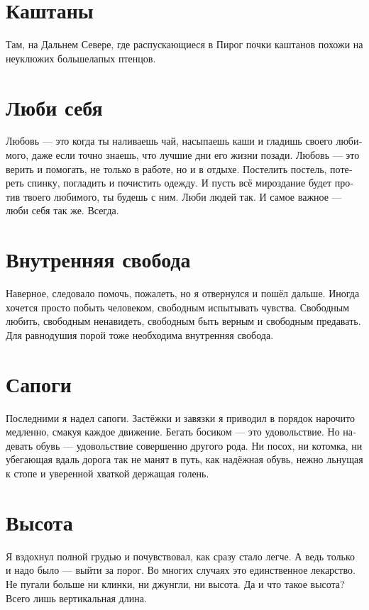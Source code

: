 \documentclass[a4paper,12pt,fleqn]{book}\usepackage{cooltooltips}\usepackage{polyglossia}\setdefaultlanguage[babelshorthands=true]{russian}\setotherlanguage{english}\defaultfontfeatures{Ligatures=TeX,Mapping=tex-text} \usepackage{xcolor}\definecolor{lightgray}{HTML}{bbbbbb}\color{lightgray}\newcommand{\ml}[3]{\textenglish{\textcolor{black}{#3}}}
\begin{document}
{\section{Каштаны}

Там, на Дальнем Севере, где распускающиеся в Пирог почки каштанов похожи на неуклюжих большелапых птенцов.

\section{Люби себя}

Любовь --- это когда ты наливаешь чай, насыпаешь каши и гладишь своего любимого, даже если точно знаешь, что лучшие дни его жизни позади.
Любовь --- это верить и помогать, не только в работе, но и в отдыхе.
Постелить постель, потереть спинку, погладить и почистить одежду.
И пусть всё мироздание будет против твоего любимого, ты будешь с ним.
Люби людей так.
И самое важное --- люби себя так же.
Всегда.

\section{Внутренняя свобода}

Наверное, следовало помочь, пожалеть, но я отвернулся и пошёл дальше.
Иногда хочется просто побыть человеком, свободным испытывать чувства.
Свободным любить, свободным ненавидеть, свободным быть верным и свободным предавать.
Для равнодушия порой тоже необходима внутренняя свобода.

\section{Сапоги}

Последними я надел сапоги.
Застёжки и завязки я приводил в порядок нарочито медленно, смакуя каждое движение.
Бегать босиком --- это удовольствие.
Но надевать обувь --- удовольствие совершенно другого рода.
Ни посох, ни котомка, ни убегающая вдаль дорога так не манят в путь, как надёжная обувь, нежно льнущая к стопе и уверенной хваткой держащая голень.

\section{Высота}

Я вздохнул полной грудью и почувствовал, как сразу стало легче.
А ведь только и надо было --- выйти за порог.
Во многих случаях это единственное лекарство.
Не пугали больше ни клинки, ни джунгли, ни высота.
Да и что такое высота?
Всего лишь вертикальная длина.

}
\end{document}
